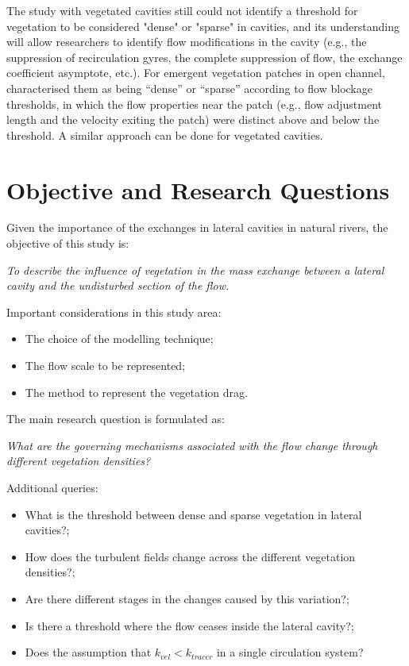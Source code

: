 \documentclass[../main.tex]{subfiles}
\begin{document}
The study with vegetated cavities still could not identify a threshold for vegetation to be considered "dense" or "sparse" in cavities, and its understanding will allow researchers to identify flow modifications in the cavity (e.g., the suppression of recirculation gyres, the complete suppression of flow, the exchange coefficient asymptote, etc.).  For emergent vegetation patches in open channel, \textcite{chen2012} characterised them as being “dense” or “sparse” according to flow blockage thresholds, in which the flow properties near the patch (e.g., flow adjustment length and the velocity exiting the patch) were distinct above and below the threshold. A similar approach can be done for vegetated cavities. 
\section{Objective and Research Questions}
Given the importance of the exchanges in lateral cavities in natural rivers, the objective of this study is:

\textit{To describe the influence of vegetation in the mass exchange between a lateral cavity and the undisturbed section of the flow.}

Important considerations in this study area:
\begin{itemize}[noitemsep,topsep=0pt,align=left,itemindent=\parindent]
    \item The choice of the modelling technique;
    \item The flow scale to be represented;
    \item The method to represent the vegetation drag.
\end{itemize}
The main research question is formulated as:

\textit{What are the governing mechanisms associated with the flow change through different vegetation densities?}

Additional queries:
\begin{itemize}[noitemsep,topsep=0pt,align=left,itemindent=\parindent]
	\item What is the threshold between dense and sparse vegetation in lateral cavities?;
    \item How does the turbulent fields change across the different vegetation densities?;
    \item Are there different stages in the changes caused by this variation?;
    \item Is there a threshold where the flow ceases inside the lateral cavity?;
    \item Does the assumption that $k_{vel} < k_{tracer}$ in a single circulation system?
\end{itemize}
\end{document}
